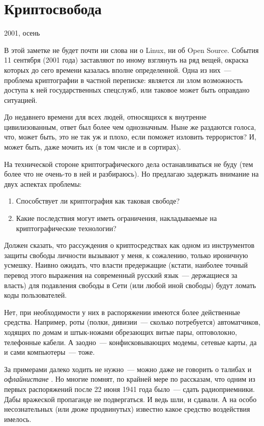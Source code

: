 \section{Криптосвобода} 
\begin{timeline}2001, осень\end{timeline}

В этой заметке не будет почти ни слова ни о Linux, ни об Open Source. События 11 сентября (2001 года) заставляют по иному взглянуть на ряд вещей, окраска которых до сего времени казалась вполне определенной. Одна из них~--- проблема криптографии в частной переписке: является ли злом возможность доступа к ней государственных спецслужб, или таковое может быть оправдано ситуацией.

До недавнего времени для всех людей, относящихся к внутренне цивилизованным, ответ был более чем однозначным. Ныне же раздаются голоса, что, может быть, это не так уж и плохо, если поможет изловить террористов? И, может быть, даже мочить их (в том числе и в сортирах).

На технической стороне криптографического дела останавливаться не буду (тем более что не очень-то в ней и разбираюсь). Но предлагаю задержать внимание на двух аспектах проблемы:

\begin{enumerate}
	\item Способствует ли криптография как таковая свободе? 
	\item Какие последствия могут иметь ограничения, накладываемые на криптографические технологии? 
\end{enumerate}

Должен сказать, что рассуждения о криптосредствах как одном из инструментов защиты свободы личности вызывают у меня, к сожалению, только ироничную усмешку. Наивно ожидать, что власти предержащие (кстати, наиболее точный перевод этого выражения на современный русский язык~--- держащиеся за власть) для подавления свободы в Сети (или любой иной свободы) будут ломать коды пользователей.

Нет, при необходимости у них в распоряжении имеются более действенные средства. Например, роты (полки, дивизии~--- сколько потребуется) автоматчиков, ходящих по домам и штык-ножами обрезающих витые пары, оптоволокно, телефонные кабели. А заодно~--- конфисковывающих модемы, сетевые карты, да и сами компьютеры~--- тоже.

За примерами далеко ходить не нужно~--- можно даже не говорить о талибах и 
\textit{офлайнистане}
. Но многие помнят, по крайней мере по рассказам, что одним из первых распоряжений после 22 июня 1941 года было~--- сдать радиоприемники. Дабы вражеской пропаганде не подвергаться. И ведь шли, и сдавали. А на особо несознательных (или дюже продвинутых) известно какое средство воздействия имелось.

